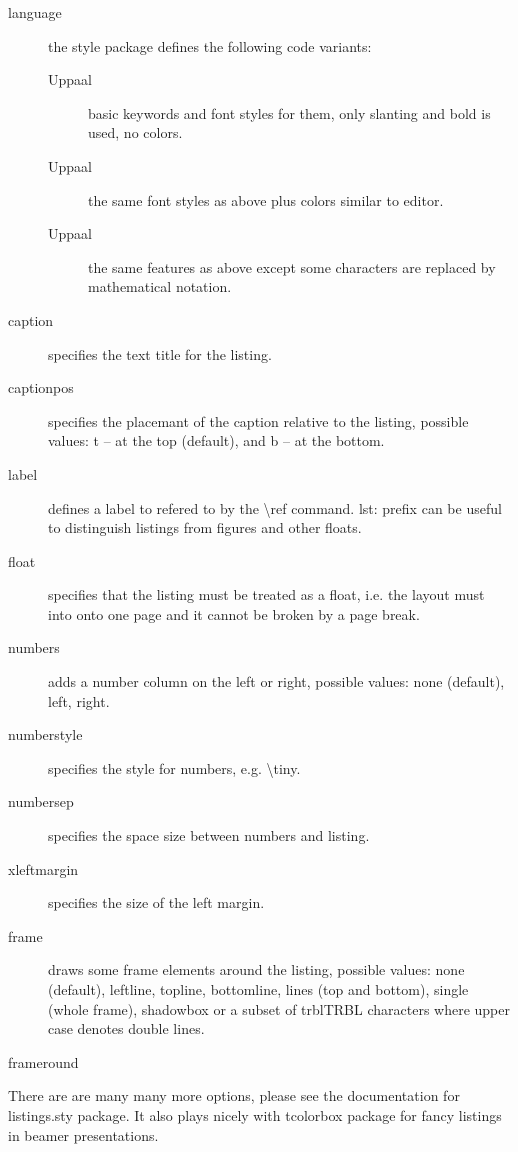 \documentclass[english,paper=a4,final]{article}
\begin{document}
\begin{description}
\item[language] the style package defines the following \uppaal code variants:
  \begin{description}
  \item[{\ttfamily Uppaal}] basic \uppaal keywords and font styles for them, only slanting and bold is used, no colors.
  \item[{\ttfamily [GUI]Uppaal}] the same font styles as above plus colors similar to \uppaal editor.
  \item[{\ttfamily [LIT]Uppaal}] the same features as above except some characters are replaced by mathematical notation.
  \end{description}
\item[caption] specifies the text title for the listing.
\item[captionpos] specifies the placemant of the caption relative to the listing, possible values: {\ttfamily t} -- at the top (default), and {\ttfamily b} -- at the bottom.
\item[label] defines a label to refered to by the {\ttfamily \textbackslash ref} command. {\ttfamily lst:} prefix can be useful to distinguish listings from figures and other floats.
\item[float] specifies that the listing must be treated as a float, i.e. the layout must into onto one page and it cannot be broken by a page break.
\item[numbers] adds a number column on the left or right, possible values: {\ttfamily none} (default), {\ttfamily left}, {\ttfamily right}.
\item[numberstyle] specifies the style for numbers, e.g. {\ttfamily \textbackslash tiny}.
\item[numbersep] specifies the space size between numbers and listing.
\item[xleftmargin] specifies the size of the left margin.
\item[frame] draws some frame elements around the listing, possible values: {\ttfamily none} (default), {\ttfamily leftline}, {\ttfamily topline}, {\ttfamily bottomline}, {\ttfamily lines} (top and bottom), {\ttfamily single} (whole frame), {\ttfamily shadowbox} or a subset of {\ttfamily trblTRBL} characters where upper case denotes double lines.
\item[frameround]
\end{description}
There are are many many more options, please see the documentation for {\ttfamily listings.sty} package.
It also plays nicely with {\ttfamily tcolorbox} package for fancy listings in {\ttfamily beamer} presentations.
\end{document}
